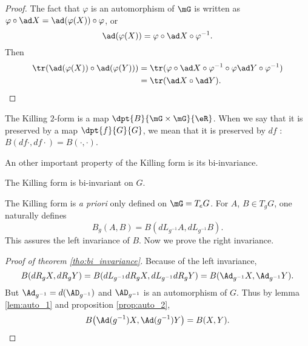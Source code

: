 \begin{proof}
The fact that $\varphi$ is an automorphism of $\mG$ is written as $\varphi\circ\ad X=\ad(\varphi(X))\circ\varphi$, or
\[
  \ad(\varphi(X))=\varphi\circ\ad X\circ\varphi^{-1}.
\]
Then
\begin{equation}
\begin{split}
\tr(\ad(\varphi(X))\circ\ad(\varphi(Y)))&=\tr(\varphi\circ\ad X\circ\varphi^{-1}\circ\varphi\ad Y\circ\varphi^{-1})\\
                                &=\tr(\ad X\circ\ad Y).
\end{split}
\end{equation}
\end{proof}


\begin{remark}
The Killing $2$-form is a map $\dpt{B}{\mG\times\mG}{\eR}$. When we say that it is preserved by a map $\dpt{f}{G}{G}$, we mean that it is preserved by $df$ : $B(df\cdot,df\cdot)=B(\cdot,\cdot)$.
\end{remark}

An other important property of the Killing form is its bi-invariance.

\begin{theorem}
The Killing form is bi-invariant on $G$.
\label{tho:bi_invariance}
\end{theorem}

\begin{remark}
The Killing form is \emph{a priori} only defined on $\mG=T_eG$. For $A$, $B\in T_gG$, one naturally defines
\begin{equation}
  B_g(A,B)=B(dL_{g^{-1}}A,dL_{g^{-1}}B).
\end{equation}
This assures the left invariance of $B$. Now we prove the right invariance.
\end{remark}


\begin{proof}[Proof of theorem \ref{tho:bi_invariance}]
Because of the left invariance,
\[
  B(dR_gX,dR_gY)=B(dL_{g^{-1}}dR_gX,dL_{g^{-1}}dR_gY)=B(\Ad_{g^{-1}}X,\Ad_{g^{-1}}Y).
\]
But $\Ad_{g^{-1}}=d(\AD_{g^{-1}})$ and $\AD_{g^{-1}}$ is an automorphism of $G$. Thus by lemma \ref{lem:auto_1} and proposition \ref{prop:auto_2},
\begin{equation}                    \label{eq_KillAdinvariant}
B\big(\Ad(g^{-1})X,\Ad(g^{-1})Y\big)=B(X,Y).
\end{equation}

\end{proof}

